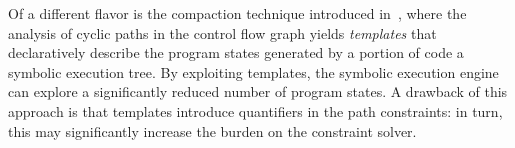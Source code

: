 
Of a different flavor is the compaction technique introduced in~\cite{SST-ATVA13}, where  the analysis of cyclic paths in the control flow graph yields {\em templates} that declaratively describe the program states generated by a portion of code  a  symbolic execution tree. By exploiting templates, the symbolic execution engine can explore a significantly reduced number of program states. A drawback of this approach is that templates introduce quantifiers in the path constraints: in turn, this may significantly increase the burden on the constraint solver.

